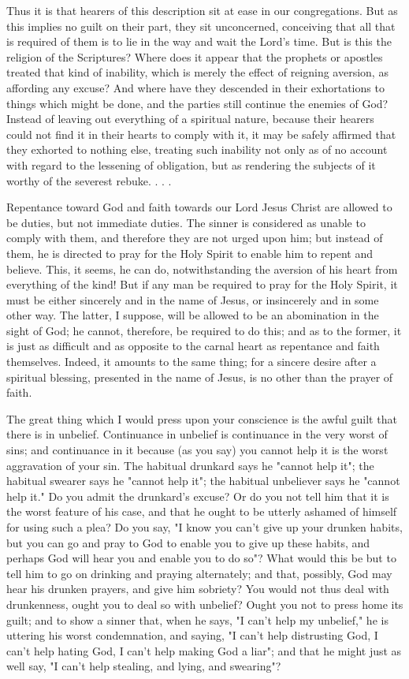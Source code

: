 \documentclass[
]{book}
\begin{document}
Thus it is that hearers of this description sit at ease in our congregations. But as this implies no guilt on their part, they sit unconcerned, conceiving that all that is required of them is to lie in the way and wait the Lord's time. But is this the religion of the Scriptures? Where does it appear that the prophets or apostles treated that kind of inability, which is merely the effect of reigning aversion, as affording any excuse? And where have they descended in their exhortations to things which might be done, and the parties still continue the enemies of God? Instead of leaving out everything of a spiritual nature, because their hearers could not find it in their hearts to comply with it, it may be safely affirmed that they exhorted to nothing else, treating such inability not only as of no account with regard to the lessening of obligation, but as rendering the subjects of it worthy of the severest rebuke. . . .

Repentance toward God and faith towards our Lord Jesus Christ are allowed to be duties, but not immediate duties. The sinner is considered as unable to comply with them, and therefore they are not urged upon him; but instead of them, he is directed to pray for the Holy Spirit to enable him to repent and believe. This, it seems, he can do, notwithstanding the aversion of his heart from everything of the kind! But if any man be required to pray for the Holy Spirit, it must be either sincerely and in the name of Jesus, or insincerely and in some other way. The latter, I suppose, will be allowed to be an abomination in the sight of God; he cannot, therefore, be required to do this; and as to the former, it is just as difficult and as opposite to the carnal heart as repentance and faith themselves. Indeed, it amounts to the same thing; for a sincere desire after a spiritual blessing, presented in the name of Jesus, is no other than the prayer of faith.

The great thing which I would press upon your conscience is the awful guilt that there is in unbelief. Continuance in unbelief is continuance in the very worst of sins; and continuance in it because (as you say) you cannot help it is the worst aggravation of your sin. The habitual drunkard says he "cannot help it"; the habitual swearer says he "cannot help it"; the habitual unbeliever says he "cannot help it." Do you admit the drunkard's excuse? Or do you not tell him that it is the worst feature of his case, and that he ought to be utterly ashamed of himself for using such a plea? Do you say, "I know you can't give up your drunken habits, but you can go and pray to God to enable you to give up these habits, and perhaps God will hear you and enable you to do so"? What would this be but to tell him to go on drinking and praying alternately; and that, possibly, God may hear his drunken prayers, and give him sobriety? You would not thus deal with drunkenness, ought you to deal so with unbelief? Ought you not to press home its guilt; and to show a sinner that, when he says, "I can't help my unbelief," he is uttering his worst condemnation, and saying, "I can't help distrusting God, I can't help hating God, I can't help making God a liar"; and that he might just as well say, "I can't help stealing, and lying, and swearing"?
\end{document}
